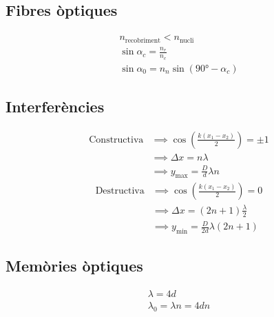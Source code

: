 \documentclass[10pt,twocolumn]{article}
\begin{document}
\subsection{Fibres òptiques}
\begin{gather*}
    n_\text{recobriment} < n_\text{nucli} \\
    \sin \alpha_c = \frac{n_r}{n_c} \\
    \sin \alpha_0 = n_n \sin\left(\ang{90}-\alpha_c\right)
\end{gather*}
\subsection{Interferències}
\begin{align*}
        \text{Constructiva} &\implies \cos\left(\frac{k\left(x_1-x_2\right)}{2}\right) = \pm 1 \\
                            &\implies \Delta x = n\lambda \\
                            &\implies y_\text{max} = \frac{D}{d}\lambda n
\end{align*}
\begin{align*}
        \text{Destructiva} &\implies \cos\left(\frac{k\left(x_1-x_2\right)}{2}\right) = 0 \\
                           &\implies \Delta x = \left(2n+1\right)\frac{\lambda}{2} \\
                           &\implies y_\text{min} = \frac{D}{2d}\lambda \left(2n+1\right)
\end{align*}
\subsection{Memòries òptiques}
\begin{gather*}
\lambda = 4d \\
\lambda_0 = \lambda n = 4dn
\end{gather*}
\end{document}
